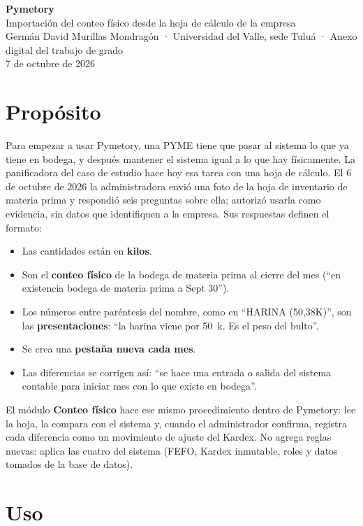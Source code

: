 \documentclass[letterpaper,11pt]{article}
\begin{document}
\begin{center}
{\LARGE\bfseries Pymetory}\\[4pt]
{\large Importación del conteo físico desde la hoja de cálculo de la empresa}\\[4pt]
Germán David Murillas Mondragón · Universidad del Valle, sede Tuluá · Anexo digital del trabajo de grado\\
{\small 7 de octubre de 2026}
\end{center}

\section{Propósito}

Para empezar a usar Pymetory, una PYME tiene que pasar al sistema lo que ya tiene en bodega, y después mantener el sistema igual a lo que hay físicamente. La panificadora del caso de estudio hace hoy esa tarea con una hoja de cálculo. El 6 de octubre de 2026 la administradora envió una foto de la hoja de inventario de materia prima y respondió seis preguntas sobre ella; autorizó usarla como evidencia, sin datos que identifiquen a la empresa. Sus respuestas definen el formato:

\begin{itemize}[nosep]
\item Las cantidades están en \textbf{kilos}.
\item Son el \textbf{conteo físico} de la bodega de materia prima al cierre del mes (``en existencia bodega de materia prima a Sept 30'').
\item Los números entre paréntesis del nombre, como en ``HARINA (50,38K)'', son las \textbf{presentaciones}: ``la harina viene por 50~k. Es el peso del bulto''.
\item Se crea una \textbf{pestaña nueva cada mes}.
\item Las diferencias se corrigen así: ``se hace una entrada o salida del sistema contable para iniciar mes con lo que existe en bodega''.
\end{itemize}

El módulo \textbf{Conteo físico} hace ese mismo procedimiento dentro de Pymetory: lee la hoja, la compara con el sistema y, cuando el administrador confirma, registra cada diferencia como un movimiento de ajuste del Kardex. No agrega reglas nuevas: aplica las cuatro del sistema (FEFO, Kardex inmutable, roles y datos tomados de la base de datos).

\section{Uso}
\end{document}
